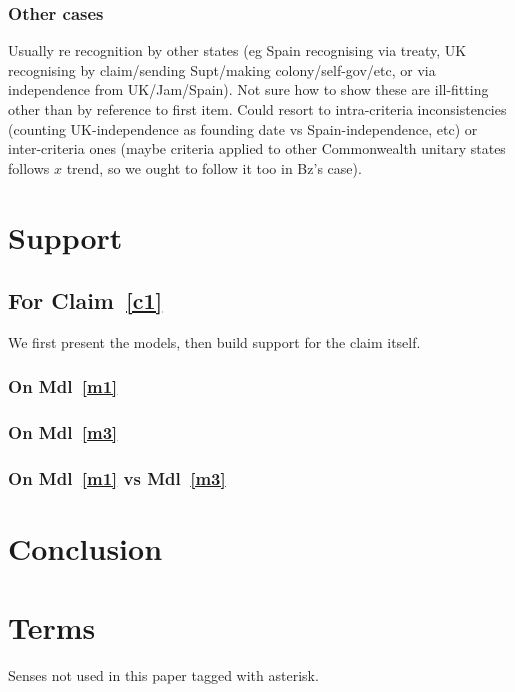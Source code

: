 \documentclass{amsart}
\theoremstyle{definition}%
\theoremstyle{definition}%
\theoremstyle{remark}%
\theoremstyle{definition}%
\theoremstyle{definition}%
\begin{document}
\subsubsection{Other cases} Usually re recognition by other states (eg Spain recognising via treaty, UK recognising by claim/sending Supt/making colony/self-gov/etc, or via independence from UK/Jam/Spain). Not sure how to show these are ill-fitting other than by reference to first item. Could resort to intra-criteria inconsistencies (counting UK-independence as founding date vs Spain-independence, etc) or inter-criteria ones (maybe criteria applied to other Commonwealth unitary states follows \(x\) trend, so we ought to follow it too in Bz's case).
%
%
%
%
\section{Support}
\label{s:support}
\subsection{For Claim~\ref{c1}} We first present the models, then build support for the claim itself.
\subsubsection{On Mdl~\ref{m1}}
\subsubsection{On Mdl~\ref{m3}}
\subsubsection{On Mdl~\ref{m1} vs Mdl~\ref{m3}}
%
%
%
%
\section{Conclusion}
\label{s:concl}
\lipsum[1][1-6]
%
%
%
% 
\begin{bibdiv}
\label{s:refs}
\begin{biblist}
\end{biblist}
\end{bibdiv}
%
%
%
%
\newpage%
\appendix%
%
%
\section{Terms}%
\label{s:terms}
Senses not used in this paper tagged with asterisk.
%
\end{document}
